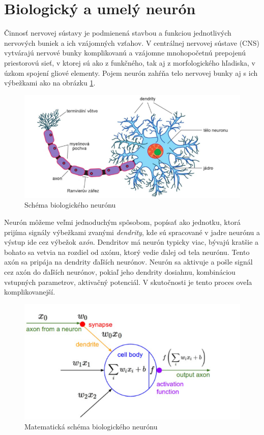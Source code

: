 \section{Biologický a umelý neurón}
Činnosť nervovej sústavy je podmienená stavbou a funkciou jednotlivých nervových buniek a ich vzájomných vzťahov. V centrálnej nervovej sústave (CNS) vytvárajú nervové bunky komplikovanú a vzájomne mnohopočetnú prepojenú priestorovú sieť, v ktorej sú ako z funkčného, tak aj z morfologického hľadiska, v úzkom spojení gliové elementy.  Pojem neurón zahŕňa telo nervovej bunky aj s ich výbežkami ako na obrázku \ref{schema_neuronu}.\cite{otomar} \par
 \begin{figure}[!ht]
 \includegraphics[width=1\textwidth]{obrazky-figures/schema_neuronu.png}
\caption{Schéma biologického neurónu\cite{otomar}}
\centering
\label{schema_neuronu}
\end{figure}
Neurón môžeme veľmi jednoduchým spôsobom, popísať ako jednotku, ktorá prijíma signály výbežkami zvanými \emph{dendrity}, kde sú spracované v jadre neurónu a výstup ide cez výbežok \emph{axón}. Dendritov má neurón typicky viac, bývajú kratšie a bohato sa vetvia na rozdiel od axónu, ktorý vedie ďalej od tela neurónu. Tento axón sa pripája na dendrity ďaľších neurónov. Neurón sa aktivuje a pošle signál cez axón do ďaľších neurónov, pokiaľ jeho dendrity dosiahnu, kombináciou vstupných parametrov, aktivačný potenciál\cite{otomar}. V skutočnosti je tento proces oveľa komplikovanejší. 
 \begin{figure}[!ht]
 \includegraphics[width=1\textwidth]{obrazky-figures/neuron_mat.png}
\caption{Matematická schéma biologického neurónu\cite{stanford}}
\centering
\label{neuron_mat}
\end{figure}
